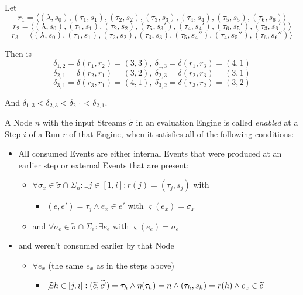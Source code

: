 \begin{exmp}
  Let
  \[r_1 = \langle (\lambda, s_0), (\tau_1,s_1), (\tau_2,s_2), (\tau_3,s_3), (\tau_4,s_4), (\tau_5,s_5), (\tau_6,s_6) \rangle\]
  \[r_2 = \langle (\lambda, s_0), (\tau_1,s_1), (\tau_2,s_2), (\tau_5,s_3'), (\tau_4,s_4'), (\tau_6,s_5'), (\tau_3,s_6') \rangle\]
  \[r_3 = \langle (\lambda, s_0), (\tau_1,s_1), (\tau_2,s_2), (\tau_3,s_3), (\tau_5,s_4''), (\tau_4,s_5''), (\tau_6,s_6'') \rangle\]

  Then is
  \[\delta_{1,2} = \delta(r_1,r_2) = (3,3),\ \delta_{1,3} = \delta(r_1,r_3) = (4,1)\]
  \[\delta_{2,1} = \delta(r_2,r_1) = (3,2),\ \delta_{2,3} = \delta(r_2,r_3) = (3,1)\]
  \[\delta_{3,1} = \delta(r_3,r_1) = (4,1),\ \delta_{3,2} = \delta(r_3,r_2) = (3,2)\]

  And \(\delta_{1,3} < \delta_{2,3} < \delta_{2,1} < \delta_{2,1}\).


\end{exmp}

\begin{definition}[name = Enabledness of a Node]\label{def:node_enabled}
  A Node \(n\) with the input Streams \(\widetilde{\sigma}\) in an evaluation Engine is called \emph{enabled} at a Step \(i\) of a Run \(r\) of that Engine, when it satisfies all of the following conditions:

  \begin{itemize}
    \item All consumed Events are either internal Events that were produced at an earlier step or external Events that are present:
      \begin{itemize}
        \item \(\forall \sigma_x \in \widetilde{\sigma} \cap \Sigma_n: \exists j \in [1, i]: r(j) = (\tau_j, s_j)\) with
          \begin{itemize}
            \item\( (e, e') = \tau_j \land e_x \in e'\) with \(\varsigma(e_x) = \sigma_x \)
          \end{itemize}
        \item and \(\forall \sigma_e \in \widetilde{\sigma} \cap\Sigma_e:\exists e_e\) with \(\varsigma(e_e) = \sigma_e\)
      \end{itemize}
    \item and weren't consumed earlier by that Node
      \begin{itemize}
        \item \(\forall e_x\) (the same \(e_x\) as in the steps above)
          \begin{itemize}
            \item \(\not\exists h \in [j, i]: (\widetilde{e}, \widetilde{e'}) = \tau_h \land \eta(\tau_h) = n \land (\tau_h, s_h) = r(h) \land e_x \in \widetilde{e}\)
          \end{itemize}
      \end{itemize}
  \end{itemize}
\end{definition}

